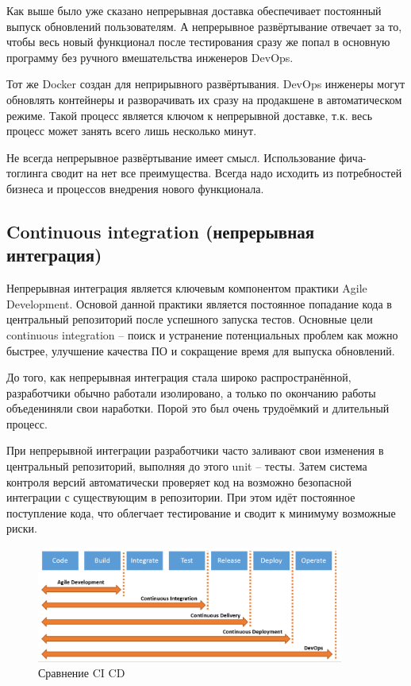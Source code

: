 Как выше было уже сказано непрерывная доставка обеспечивает постоянный выпуск обновлений пользователям. А непрерывное развёртывание отвечает за то, чтобы весь новый функционал после тестирования сразу же попал в основную программу без ручного вмешательства инженеров DevOps.

Тот же Docker создан для неприрывного развёртывания. DevOps инженеры могут обновлять контейнеры и разворачивать их сразу на продакшене в автоматическом режиме. Такой процесс является ключом к непрерывной доставке, т.к. весь процесс может занять всего лишь несколько минут.

Не всегда непрерывное развёртывание имеет смысл. Использование фича-тоглинга сводит на нет все преимущества. Всегда надо исходить из потребностей бизнеса и процессов внедрения нового функционала.

\subsection{Continuous integration (непрерывная интеграция)}

Непрерывная интеграция является ключевым компонентом практики Agile Development. Основой данной практики является постоянное попадание кода в центральный репозиторий после успешного запуска тестов. Основные цели continuous integration – поиск и устранение потенциальных проблем как можно быстрее, улучшение качества ПО и сокращение время для выпуска обновлений.

До того, как непрерывная интеграция стала широко распространённой, разработчики обычно работали изолировано, а только по окончанию работы объедениняли свои наработки. Порой это был очень трудоёмкий и длительный процесс.

При непрерывной интеграции разработчики часто заливают свои изменения в центральный репозиторий, выполняя до этого unit – тесты. Затем система контроля версий автоматически проверяет код на возможно безопасной интеграции с существующим в репозитории. При этом идёт постоянное поступление кода, что облегчает тестирование и сводит к минимуму возможные риски.

\begin{figure}[h!]
\centering
\includegraphics[width=0.9\textwidth]{img/ci-vs-cd-devops-difference.jpg}
\caption{Сравнение CI CD}
\label{fig5}
\end{figure}

